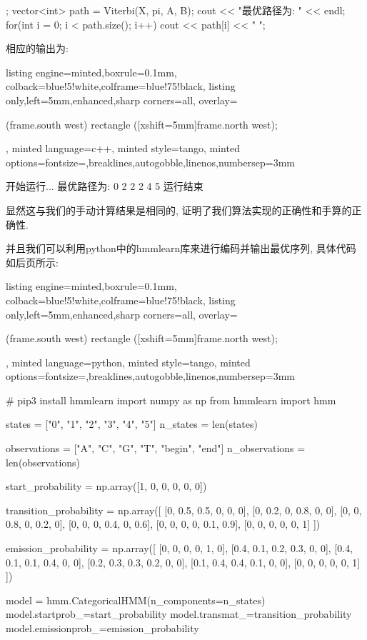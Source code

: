 \documentclass{article}
\begin{document}
\begin{homeworkProblem}
\begin{tcblisting}
{{    };
    vector<int> path = Viterbi(X, pi, A, B);
    cout << "最优路径为: " << endl;
    for(int i = 0; i < path.size(); i++) {
        cout << path[i] << " ";
    }
}
\end{tcblisting}
相应的输出为:
\begin{tcblisting}{listing engine=minted,boxrule=0.1mm,
colback=blue!5!white,colframe=blue!75!black,
listing only,left=5mm,enhanced,sharp corners=all,
overlay={\begin{tcbclipinterior} (frame.south west)
rectangle ([xshift=5mm]frame.north west);\end{tcbclipinterior}},
minted language=c++,
minted style=tango,
minted options={fontsize=\small,breaklines,autogobble,linenos,numbersep=3mm}}
开始运行...
最优路径为: 0 2 2 2 4 5 
运行结束
\end{tcblisting}
显然这与我们的手动计算结果是相同的, 证明了我们算法实现的正确性和手算的正确性.

并且我们可以利用python中的hmmlearn库来进行编码并输出最优序列, 具体代码如后页所示:
\begin{tcblisting}{listing engine=minted,boxrule=0.1mm,
colback=blue!5!white,colframe=blue!75!black,
listing only,left=5mm,enhanced,sharp corners=all,
overlay={\begin{tcbclipinterior} (frame.south west)
rectangle ([xshift=5mm]frame.north west);\end{tcbclipinterior}},
minted language=python,
minted style=tango,
minted options={fontsize=\small,breaklines,autogobble,linenos,numbersep=3mm}}
# pip3 install hmmlearn
import numpy as np
from hmmlearn import hmm

states = ["0", "1", "2", "3", "4", "5"]
n_states = len(states)

observations = ["A", "C", "G", "T", "begin", "end"]
n_observations = len(observations)

start_probability = np.array([1, 0, 0, 0, 0, 0])

transition_probability = np.array([
    [0, 0.5, 0.5, 0, 0, 0],
    [0, 0.2, 0, 0.8, 0, 0],
    [0, 0, 0.8, 0, 0.2, 0],
    [0, 0, 0, 0.4, 0, 0.6],
    [0, 0, 0, 0, 0.1, 0.9],
    [0, 0, 0, 0, 0, 1]
])

emission_probability = np.array([
    [0, 0, 0, 0, 1, 0],
    [0.4, 0.1, 0.2, 0.3, 0, 0],
    [0.4, 0.1, 0.1, 0.4, 0, 0],
    [0.2, 0.3, 0.3, 0.2, 0, 0],
    [0.1, 0.4, 0.4, 0.1, 0, 0],
    [0, 0, 0, 0, 0, 1]
])

model = hmm.CategoricalHMM(n_components=n_states)
model.startprob_=start_probability
model.transmat_=transition_probability
model.emissionprob_=emission_probability


\end{tcblisting}
\end{homeworkProblem}
\end{document}
